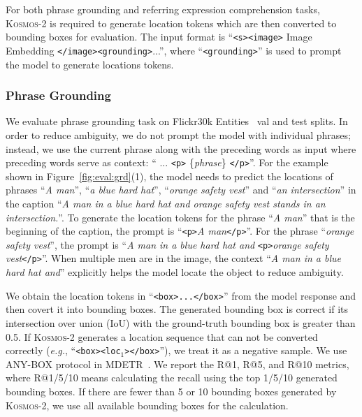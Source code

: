 \documentclass{article}
\newcommand\our{\textsc{Kosmos-2}}
\newcommand\eg{\textit{e.g.}}
\begin{document}
For both phrase grounding and referring expression comprehension tasks, \our{} is required to generate location tokens which are then converted to bounding boxes for evaluation. 
The input format is ``\texttt{<s>}\texttt{<image>} Image Embedding \texttt{</image>}\texttt{<grounding>}...'', where ``\texttt{<grounding>}'' is used to prompt the model to generate locations tokens.

\subsubsection{Phrase Grounding}

We evaluate phrase grounding task on Flickr30k Entities~\cite{flickr_entity} val and test splits. 
In order to reduce ambiguity, we do not prompt the model with individual phrases; instead, we use the current phrase along with the preceding words as input where preceding words serve as context:
`` ... \texttt{<p>} \{\textit{phrase}\} \texttt{</p>}''.
For the example shown in Figure~\ref{fig:eval:grd}(1), the model needs to predict the locations of phrases ``\textit{A man}'', ``\textit{a blue hard hat}'', ``\textit{orange safety vest}'' and ``\textit{an intersection}'' in the caption ``\textit{A man in a blue hard hat and orange safety vest stands in an intersection.}''. 
To generate the location tokens for the phrase ``\textit{A man}'' that is the beginning of the caption, the prompt is ``\texttt{<p>}\textit{A man}\texttt{</p>}''. 
For the phrase ``\textit{orange safety vest}'', the prompt is ``\textit{A man in a blue hard hat and} \texttt{<p>}\textit{orange safety vest}\texttt{</p>}''.
When multiple men are in the image, the context ``\textit{A man in a blue hard hat and}'' explicitly helps the model locate the object to reduce ambiguity.

We obtain the location tokens in ``\texttt{<box>...</box>}'' from the model response and then covert it into bounding boxes.
The generated bounding box is correct if its intersection over union (IoU) with the ground-truth bounding box is greater than 0.5.
If \our{} generates a location sequence that can not be converted correctly (\eg, ``\texttt{<box><loc$_1$></box>}''), we treat it as a negative sample.
We use \textsc{ANY-BOX} protocol in MDETR~\cite{mdetr}.
We report the R@1, R@5, and R@10 metrics, where R@1/5/10 means calculating the recall using the top 1/5/10 generated bounding boxes. 
If there are fewer than 5 or 10 bounding boxes generated by \our{}, we use all available bounding boxes for the calculation.
\end{document}
